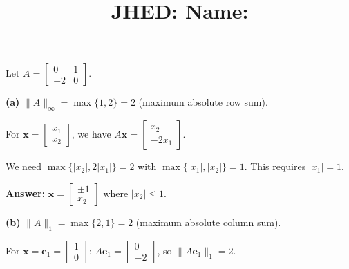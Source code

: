 \documentclass[reqno]{exam}
\title{\normalsize{
  JHED: \underline{\hspace{4cm}} \hspace{1em} Name: \underline{\hspace{9cm}}}
   }
\author{}
\date{}
\begin{document}
\maketitle
\vspace{-2cm} %

\begin{questions}

\question 
Let $A = \begin{bmatrix} 0 & 1 \\ -2 & 0 \end{bmatrix}$.

\begin{solution}
\textbf{(a)} $\|A\|_\infty = \max\{1, 2\} = 2$ (maximum absolute row sum).

For $\mathbf{x} = \begin{bmatrix} x_1 \\ x_2 \end{bmatrix}$, we have $A\mathbf{x} = \begin{bmatrix} x_2 \\ -2x_1 \end{bmatrix}$.

We need $\max\{|x_2|, 2|x_1|\} = 2$ with $\max\{|x_1|, |x_2|\} = 1$. This requires $|x_1| = 1$.

\textbf{Answer:} $\mathbf{x} = \begin{bmatrix} \pm 1 \\ x_2 \end{bmatrix}$ where $|x_2| \leq 1$.

\textbf{(b)} $\|A\|_1 = \max\{2, 1\} = 2$ (maximum absolute column sum).

For $\mathbf{x} = \mathbf{e}_1 = \begin{bmatrix} 1 \\ 0 \end{bmatrix}$: $A\mathbf{e}_1 = \begin{bmatrix} 0 \\ -2 \end{bmatrix}$, so $\|A\mathbf{e}_1\|_1 = 2$.


\end{solution}
\end{questions}
\end{document}
